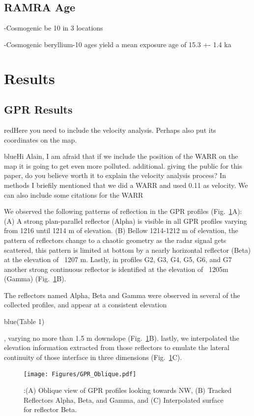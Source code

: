 \documentclass[5p]{elsarticle}
\newcommand{\COMON}{\begin{color}{blue}}
\newcommand{\COMOFF}{\end{color}}
\newcommand{\alon}{\begin{color}{red}}
\newcommand{\aloff}{\end{color}}
\begin{document}
\subsection{RAMRA Age}

-Cosmogenic be 10 in 3 locations

-Cosmogenic beryllium-10 ages yield a mean exposure age of 15.3 +- 1.4 ka


\bigskip  

 
\section{Results}


\subsection{GPR Results}

\alon Here you need to include the velocity analysis. Perhaps also put
its coordinates on the map.\aloff


\COMON Hi Alain, I am afraid that if we include the position of the WARR on the map it is going to get even more polluted.
        additional. giving the public for this paper, do you believe worth it to explain the velocity analysis process? In methods I briefily mentioned that we did a WARR and used 0.11 as velocity. We can also include some citations for the WARR \COMOFF


We observed the following patterns of reflection in the GPR profiles (Fig.~\ref{GPR_Oblique}A): (A) A strong plan-parallel reflector (Alpha) is visible in all GPR profiles varying from 1216 until 1214 m of elevation. (B) Bellow 1214-1212 m of elevation, the pattern of reflectors change to a chaotic geometry as the radar signal gets scattered, this pattern is limited at bottom  by a nearly horizontal reflector (Beta)  at the elevation of ~1207 m. Lastly, in profiles G2,  G3, G4, G5, G6, and G7 another strong continuous reflector is identified at the elevation of ~1205m (Gamma) (Fig.~\ref{GPR_Oblique}B). 

The reflectors named Alpha, Beta and Gamma were observed in several of the collected profiles, and appear at a consistent elevation \COMON (Table 1) \COMOFF, varying no more than 1.5 m downslope (Fig.~\ref{GPR_Oblique}B). lastly, we interpolated the elevation information extracted from those reflectors to emulate the lateral continuity of those interface in three dimensions (Fig.~\ref{GPR_Oblique}C).  


								 \begin{figure}[h]

	\texttt{[image: Figures/GPR\_Oblique.pdf]}
		\caption{:(A) Oblique view of GPR profiles looking towards NW, (B) Tracked Reflectors Alpha, Beta, and Gamma, and (C) Interpolated surface for reflector Beta. \label{GPR_Oblique}}

								   \end{figure}
								   
\end{document}
